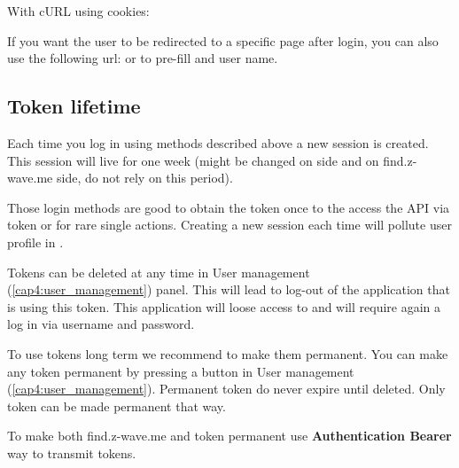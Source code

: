 With cURL using cookies:
{\scriptsize
\begin{quote} 
\end{quote}
}


If you want the user to be redirected to a specific page after login, you can also use the following url:  or  to pre-fill \zwaydeviceid and user name.

\subsection{Token lifetime}
\label{cap:authentication_usage}

Each time you log in using methods described above a new session is created. This session will live for one week (might be changed on \zway side and on find.z-wave.me side, do not rely on this period).

Those login methods are good to obtain the token once to the access the API via token or for rare single actions. Creating a new session each time will pollute user profile in \zway.

Tokens can be deleted at any time in User management (\ref{cap4:user_management}) panel. This will lead to log-out of the application that is using this token. This application will loose access to \zway and will require again a log in via username and password.

To use tokens long term we recommend to make them permanent. You can make any token permanent by pressing a button in User management (\ref{cap4:user_management}).
Permanent token do never expire until deleted. Only \zway token can be made permanent that way.

To make both find.z-wave.me and \zway token permanent use \textbf{Authentication Bearer} way to transmit tokens.

